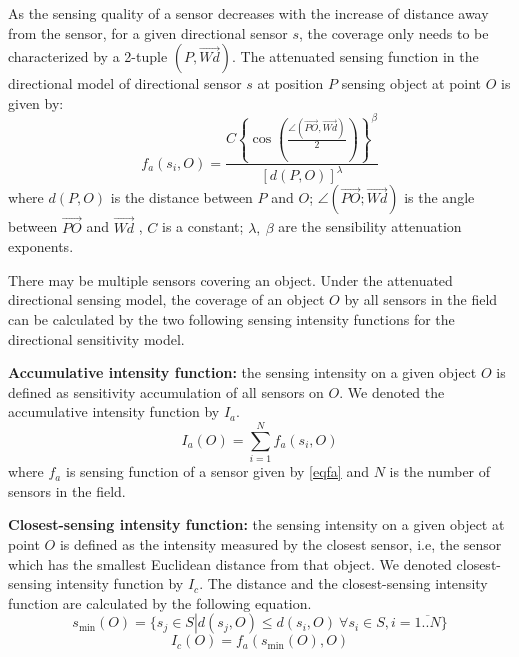 \documentclass[final]{elsarticle}
\begin{document}
As the sensing quality of a sensor decreases with the increase of distance away from the sensor, for a given directional sensor $ s $, the coverage only needs to be characterized by a 2-tuple $ (P, \overrightarrow{Wd}) $. The attenuated sensing function in the directional model of directional sensor $ s $ at position $ P $ sensing object at point $O$ is given by:
\begin{equation}
\label{eqfa}
f_a({s_i},O) = \frac{{C{{\left\{ {\cos \left( {\frac{{\angle (\overrightarrow {PO} ,\overrightarrow {Wd}) }}{2}} \right)} \right\}}^\beta }}}{{{{\left[ {d(P,O)} \right]}^\lambda }}}
\end{equation}
where $ d(P, O) $ is the distance between $ P $ and $ O $; $ \angle (\overrightarrow {PO}; \overrightarrow {Wd})$ is the angle between $ \overrightarrow {PO} $ and $ \overrightarrow {Wd}$ , $C$ is a constant; $ \lambda,\ \beta $ are the sensibility attenuation exponents. 

There may be multiple sensors covering an object. Under the attenuated directional sensing model, the coverage of an object $ O $ by all sensors in the field can be calculated by the two following sensing intensity functions for the directional sensitivity model. 

\textbf{Accumulative intensity function:} the sensing intensity on a given object $ O $ is defined as sensitivity accumulation of all sensors on $ O $. We denoted the accumulative intensity function by $ I_a $.
\begin{equation}
\label{eqia}
I_a(O) = \sum\limits_{i = 1}^N {f_a({s_i},O)} 
\end{equation}
where $ f_a $ is sensing function of a sensor given by \eqref{eqfa} and $ N $ is the number of sensors in the field.

\textbf{Closest-sensing intensity function:} the sensing intensity on a given object at point $ O $ is defined as the intensity measured by the closest sensor, i.e, the sensor which has the smallest Euclidean distance from that object. We denoted closest-sensing intensity function by $ I_c $. The distance and the closest-sensing intensity function are calculated by the following equation. 
\begin{equation}
\label {eq6}
{s_{\min}(O)} = \{ {s_j} \in S\left| {d({s_j},O) \le d({s_i},O) \ \forall {s_i} \in S,i = \overline {1..N} } \right.\} 
\end{equation}
\begin{equation}
\label{eqic}
I_c(O) = f_a({s_{\min }(O)},O)
\end{equation}
\end{document}
